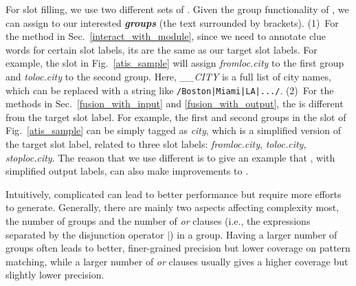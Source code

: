 For slot filling, we use two different sets of \REs. Given the group functionality of \RE, we can assign \REtags to our interested
\textbf{\emph{\RE groups}} (the text surrounded by brackets). (1)~For the method in Sec.~\ref{interact_with_module}, since we need to
annotate clue words for certain slot labels, its \REtags are the same as our target slot labels.
For example, the slot \RE in Fig.~\ref{atis_sample} will assign \emph{fromloc.city} to the first \RE group and \emph{toloc.city} to the second group.
Here, \emph{\_\_CITY} is a full list of city names, which can be replaced with a string like \texttt{/Boston|Miami|LA|.../}.
(2)~For the methods in Sec.~\ref{fusion_with_input} and \ref{fusion_with_output}, the
\REtag is different from the target slot label.
For example, the first and second \RE groups in the slot \RE of Fig.~\ref{atis_sample} can be simply tagged as \emph{city},
which is a simplified version of the target slot label, related to three slot labels: \emph{fromloc.city}, \emph{toloc.city}, \emph{stoploc.city}.
The reason that we use different \REs is to give an example that \REs,
with simplified output labels, can also make improvements to \NN.


Intuitively, complicated \REs can lead to better performance but require more efforts to generate. %
 Generally, there are mainly two aspects affecting \RE complexity most, the number of \RE groups
and the number of \emph{or} clauses (i.e., the expressions separated by the disjunction operator $|$) in a \RE group. Having a larger
number of \RE groups often leads to better, finer-grained precision but lower coverage on pattern matching, while a larger number of
\emph{or} clauses usually gives a higher coverage but slightly lower precision.


